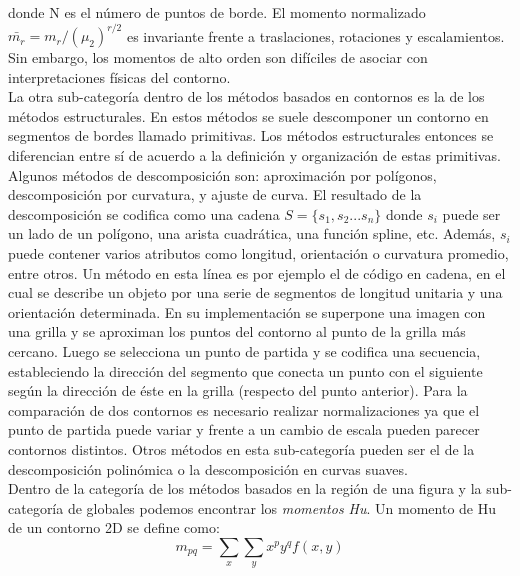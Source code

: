 donde N es el n\'umero de puntos de borde. El momento normalizado $\bar{m_r}=m_r / (\mu_2)^{r/2}$
es invariante frente a traslaciones, rotaciones y escalamientos. Sin 
embargo, los momentos de alto orden
son dif\'iciles de asociar con interpretaciones f\'isicas del contorno.\\
\indent La otra sub-categor\'ia dentro de los m\'etodos basados en contornos es la de los m\'etodos estructurales.
En estos m\'etodos se suele descomponer un contorno en segmentos de bordes llamado primitivas. Los m\'etodos estructurales
entonces se diferencian entre s\'i de acuerdo a la definici\'on y organizaci\'on de estas primitivas. Algunos m\'etodos
de descomposici\'on son: aproximaci\'on por pol\'igonos, descomposici\'on por curvatura, y ajuste de curva. El resultado
de la descomposici\'on se codifica como una cadena $S=\{s_1,s_2...s_n\}$ donde $s_i$ puede ser un lado de un pol\'igono, una 
arista cuadr\'atica, una funci\'on spline, etc. Adem\'as, $s_i$ puede 
contener varios atributos como longitud, orientaci\'on o curvatura 
promedio, entre otros.
Un m\'etodo en esta l\'inea es por ejemplo el de c\'odigo en cadena, en el 
cual se describe un objeto por una serie de segmentos de longitud 
unitaria y una orientaci\'on determinada. 
En su implementaci\'on se superpone una imagen con una grilla y se aproximan los puntos del contorno al 
punto de la grilla m\'as cercano. Luego se selecciona un punto de 
partida y se codifica una secuencia, estableciendo la direcci\'on del segmento
que conecta un punto con el siguiente seg\'un la direcci\'on de \'este en 
la grilla (respecto del punto  anterior). Para la comparaci\'on de dos
contornos es necesario realizar normalizaciones ya que el punto de 
partida puede variar y frente a un cambio de escala pueden parecer 
contornos distintos. Otros m\'etodos en esta sub-categor\'ia pueden ser el de la descomposici\'on polin\'omica o la descomposici\'on en curvas suaves. \\
\indent Dentro de la categor\'ia de los m\'etodos basados en la regi\'on 
de una figura y la sub-categor\'ia de globales podemos encontrar los \textit{momentos Hu}.
Un momento de Hu de un contorno 2D se define como:
\[
	m_{pq}=\sum_{x}{\sum_{y}{x^py^qf(x,y)}}
\]

